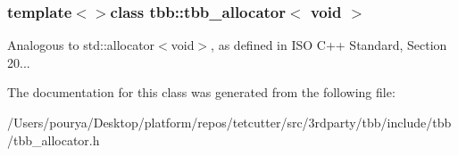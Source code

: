 \subsubsection*{template$<$$>$class tbb\+::tbb\+\_\+allocator$<$ void $>$}

Analogous to std\+::allocator$<$void$>$, as defined in I\+S\+O C++ Standard, Section 20... 



The documentation for this class was generated from the following file\+:\begin{DoxyCompactItemize}
\item 
/\+Users/pourya/\+Desktop/platform/repos/tetcutter/src/3rdparty/tbb/include/tbb/tbb\+\_\+allocator.\+h\end{DoxyCompactItemize}
